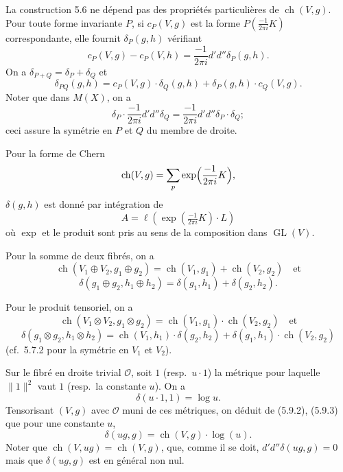 \documentclass[12pt,a4paper]{article}
\theoremstyle{plain}
\theoremstyle{definition}
\DeclareMathOperator{\ch}{ch}
\DeclareMathOperator{\GL}{GL}
\newcommand{\Oo}{\mathscr{O}}
\begin{document}
\subsection{}

La construction 5.6 ne d\'epend pas des propri\'et\'es particuli\`eres de
$\ch(V, g)$. Pour toute forme invariante $P$, si $c_P(V, g)$ est la forme $P(\frac{-1}{2\pi i} K)$
correspondante, elle fournit $\delta_P(g, h)$ v\'erifiant
\[
c_P(V, g) - c_P(V, h) = \frac{-1}{2\pi i} d'd'' \delta_P(g, h) .
\]
On a $\delta_{P+Q} = \delta_P + \delta_Q$ et
\begin{equation}\label{eq:5.7.1}
\delta_{PQ}(g, h) = c_P(V, g) \cdot \delta_Q(g, h) + \delta_P(g, h) \cdot c_Q(V, g) .
\end{equation}
Noter que dans $M(X)$, on a
\begin{equation}\label{eq:5.7.2}
\delta_P \cdot \frac{-1}{2\pi i} d'd'' \delta_Q = \frac{-1}{2\pi i} d'd'' \delta_P \cdot \delta_Q ;
\end{equation}
ceci assure la sym\'etrie en $P$ et $Q$ du membre de droite.

Pour la forme de Chern
\[
\ch(V, g) = \sum_p \exp\Bigl(\frac{-1}{2\pi i} K\Bigr) ,
\]
$\delta(g, h)$ est donn\'e par int\'egration de
\[
A = \ell(\exp(\tfrac{-1}{2\pi i} K) \cdot L)
\]
o\`u $\exp$ et le produit sont pris au sens de la composition dans $\GL(V)$.

Pour la somme de deux fibr\'es, on a
\[
\ch(V_1 \oplus V_2, g_1 \oplus g_2) = \ch(V_1, g_1) + \ch(V_2, g_2) \quad \text{et}
\]
\begin{equation}\label{eq:5.9.1}
\delta(g_1 \oplus g_2, h_1 \oplus h_2) = \delta(g_1, h_1) + \delta(g_2, h_2) .
\end{equation}

Pour le produit tensoriel, on a
\begin{equation}\label{eq:5.9.2}
\ch(V_1 \otimes V_2, g_1 \otimes g_2) = \ch(V_1, g_1) \cdot \ch(V_2, g_2) \quad \text{et}
\end{equation}
\[
\delta(g_1 \otimes g_2, h_1 \otimes h_2) = \ch(V_1, h_1) \cdot \delta(g_2, h_2) + \delta(g_1, h_1) \cdot \ch(V_2, g_2)
\]
(cf.~5.7.2 pour la sym\'etrie en $V_1$ et $V_2$).

Sur le fibr\'e en droite trivial $\Oo$, soit $1$ (resp.\ $u \cdot 1$) la m\'etrique pour laquelle
$\|1\|^2$ vaut $1$ (resp.\ la constante $u$). On a
\begin{equation}\label{eq:5.9.3}
\delta(u \cdot 1, 1) = \log u .
\end{equation}
Tensorisant $(V, g)$ avec $\Oo$ muni de ces m\'etriques, on d\'eduit de (5.9.2), (5.9.3)
que pour une constante $u$,
\begin{equation}\label{eq:5.9.4}
\delta(ug, g) = \ch(V, g) \cdot \log(u) .
\end{equation}
Noter que $\ch(V, ug) = \ch(V, g)$, que, comme il se doit, $d'd''\delta(ug, g) = 0$ mais que
$\delta(ug, g)$ est en g\'en\'eral non nul.
\end{document}
